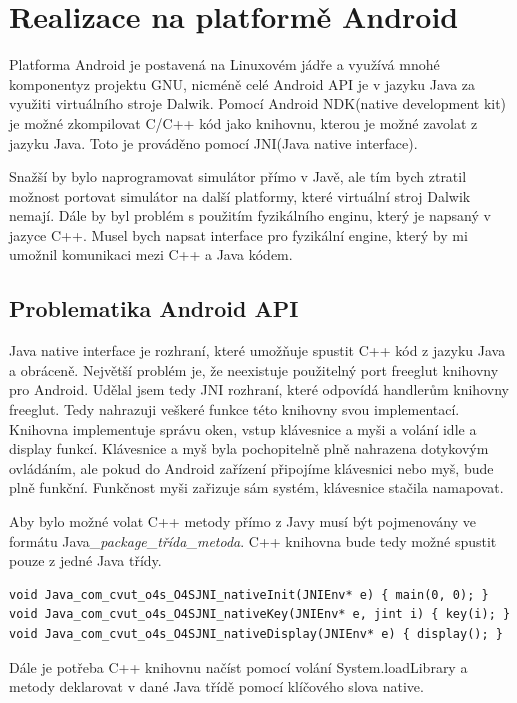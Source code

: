 \documentclass[11pt,twoside,a4paper]{book}
\begin{document}
\section{Realizace na platformě Android}
Platforma Android je postavená na Linuxovém jádře a využívá mnohé komponenty\linebreak z projektu GNU, nicméně celé Android API je v jazyku Java za využiti virtuálního stroje Dalwik. Pomocí Android NDK(native development kit) je možné zkompilovat C/C++ kód jako knihovnu, kterou je možné zavolat z jazyku Java. Toto je prováděno pomocí JNI(Java native interface).

Snažší by bylo naprogramovat simulátor přímo v Javě, ale tím bych ztratil možnost portovat simulátor na další platformy, které virtuální stroj Dalwik nemají. Dále by byl problém s použitím fyzikálního enginu, který je napsaný v jazyce C++. Musel bych napsat interface pro fyzikální engine, který by mi umožnil komunikaci mezi C++ a Java kódem.

\subsection{Problematika Android API}
Java native interface je rozhraní, které umožňuje spustit C++ kód z jazyku Java a obráceně. Největší problém je, že neexistuje použitelný port freeglut knihovny pro Android. Udělal jsem tedy JNI rozhraní, které odpovídá handlerům knihovny freeglut. Tedy nahrazuji veškeré funkce této knihovny svou implementací. Knihovna implementuje správu oken, vstup klávesnice a myši a volání idle a display funkcí. Klávesnice a myš byla pochopitelně plně nahrazena dotykovým ovládáním, ale pokud do Android zařízení připojíme klávesnici nebo myš, bude plně funkční. Funkčnost myši zařizuje sám systém, klávesnice stačila namapovat.

Aby bylo možné volat C++ metody přímo z Javy musí být pojmenovány ve formátu Java\_\textit{package}\_\textit{třída}\_\textit{metoda}. C++ knihovna bude tedy možné spustit pouze z jedné Java třídy.
\lstset{language=C++} 
\begin{lstlisting}[caption=Volání metod pomocí JNI v C++ pro nahrazení freeglut knihovny]
void Java_com_cvut_o4s_O4SJNI_nativeInit(JNIEnv* e) { main(0, 0); }
void Java_com_cvut_o4s_O4SJNI_nativeKey(JNIEnv* e, jint i) { key(i); }
void Java_com_cvut_o4s_O4SJNI_nativeDisplay(JNIEnv* e) { display(); }
\end{lstlisting}

Dále je potřeba C++ knihovnu načíst pomocí volání System.loadLibrary a metody deklarovat v dané Java třídě pomocí klíčového slova native.
\end{document}
